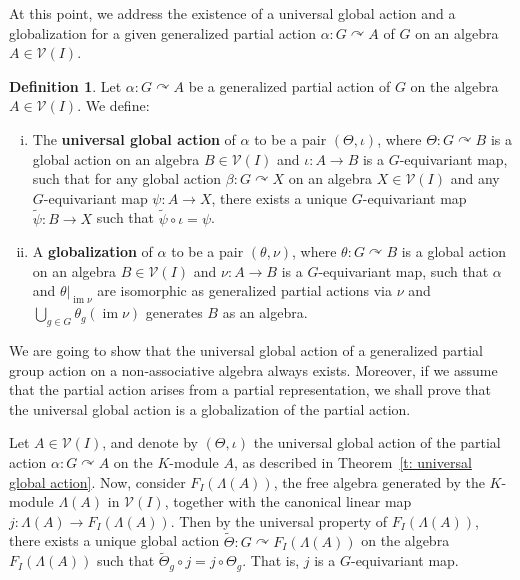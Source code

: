 \documentclass[11pt]{amsart}
\numberwithin{equation}{section}
\theoremstyle{definition}
\newtheorem{definition}[theorem]{Definition}
\theoremstyle{remark}
\newcommand*{\im}{\operatorname{im}} %
\newcommand{\cb}[1]{{\color{red}#1}}
\begin{document}
At this point, we address the existence of a universal global action and a globalization for a given generalized partial action \(\alpha: G \curvearrowright A\) of \(G\) on an algebra \(A \in \mathcal{V}(I)\).


\begin{definition}\label{def:GlobalizationForGeneralizewdParActions}
    Let \(\alpha: G \curvearrowright A\) be a generalized partial action of \(G\) on the algebra \(A \in \mathcal{V}(I)\). We define:
    \begin{enumerate}[(i)]
        \item The \textbf{universal global action} of \(\alpha\) to be a pair \((\Theta, \iota)\), where \(\Theta: G \curvearrowright B\) is a global action on an algebra \(B \in \mathcal{V}(I)\) and \(\iota: A \to B\) is a \(G\)-equivariant map, such that for any global action \(\beta: G \curvearrowright X\) on an algebra \(X \in \mathcal{V}(I)\) and any \(G\)-equivariant map \(\psi: A \to X\), there exists a unique $G$-equivariant map \(\widetilde{\psi}: B \to X\) such that \(\widetilde{\psi} \circ \iota = \psi\).
        \item A \textbf{globalization} of \(\alpha\) to be a pair \((\theta, \nu)\), where \(\theta: G \curvearrowright B\) is a global action on an algebra \(B \in \mathcal{V}(I)\) and \(\nu: A \to B\) is a \(G\)-equivariant map, such that \(\alpha\) and \(\theta|_{\im \nu}\) are isomorphic as generalized partial actions via \(\nu\) and \(\bigcup_{g \in G}\theta_{g}(\im \nu)\) generates \(B\) as an algebra.
    \end{enumerate}
\end{definition}

We are going to show that the universal global action of a generalized partial group action on a non-associative algebra always exists. Moreover, if we assume that the partial action arises from a partial representation, we shall prove that the universal global action is a globalization of the partial action. %

 Let \( A \in \mathcal{V}(I) \),  and denote by \((\Theta, \iota)\)  the universal global action of the partial action \(\alpha: G \curvearrowright A\) on the \(K\)-module \(A\), as described in Theorem~\ref{t: universal global action}. Now, consider \(F_I(\Lambda(A))\), the free algebra generated by the \(K\)-module \(\Lambda(A)\) in \(\mathcal{V}(I)\), together with the  canonical linear map \(j: \Lambda(A) \to F_I(\Lambda(A))\). Then by the universal property of \(F_I(\Lambda(A))\), there exists a unique global action \(\widetilde{\Theta}: G \curvearrowright F_I(\Lambda(A))\)  on the algebra \(F_I(\Lambda(A))\) such that \(\widetilde{\Theta}_g \circ j = j \circ \Theta_g\). That is, \(j\) is a $G$-equivariant map.
\end{document}
